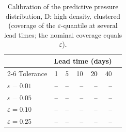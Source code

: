 \begin{table}[htbp]
\centering
\caption{Calibration of the predictive pressure distribution, D: high density, clustered
(coverage of the $\varepsilon$-quantile at several lead times; the nominal
coverage equals $\varepsilon$).}
\label{tab:ch6-calibration-D}
\begin{tabular}{@{}lrrrrrr@{}}
\toprule
& \multicolumn{5}{c}{Lead time (days)} \\
\cmidrule(r){2-6}
Tolerance & 1 & 5 & 10 & 20 & 40 \\
\midrule

$\varepsilon=0.01$ & -- & -- & -- & -- & -- \\
$\varepsilon=0.05$ & -- & -- & -- & -- & -- \\
$\varepsilon=0.10$ & -- & -- & -- & -- & -- \\
$\varepsilon=0.25$ & -- & -- & -- & -- & -- \\
\bottomrule
\end{tabular}
\end{table}
